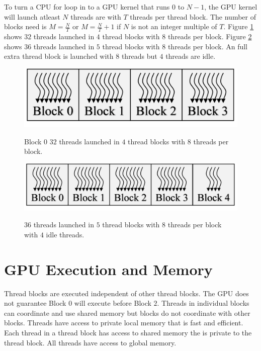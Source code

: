 To turn a CPU for loop in to a GPU kernel that runs $0$ to $N-1$, the GPU kernel will launch atleast $N$ threads are with $T$ threads per thread block.
The number of blocks need is $M = \frac{N}{T}$ or $M = \frac{N}{T}+1$ if $N$ is not an integer multiple of $T$.
Figure \ref{fig:threadsBlocks32} shows $32$ threads launched in $4$ thread blocks with $8$ threads per block.
Figure \ref{fig:threadsBlocks36} shows $36$ threads launched in $5$ thread blocks with $8$ threads per block. 
An full extra thread block is launched with $8$ threads but $4$ threads are idle.
\begin{figure}
	\centering\includegraphics[width=4in/100*55]{figures/gpu_intro/threadsBlocks32.pdf}
	\label{fig:threadsBlocks32}
	\caption{Block $0$ $32$ threads launched in $4$ thread blocks with $8$ threads per block.}
\end{figure}
\begin{figure}
	\centering\includegraphics[width=5in/100*55]{figures/gpu_intro/threadsBlocks36.pdf}
	\label{fig:threadsBlocks36}
	\caption{$36$ threads launched in $5$ thread blocks with $8$ threads per block with $4$ idle threads.}
\end{figure}

\section{GPU Execution and Memory}
\label{sec:GPU_memory}
Thread blocks are executed independent of other thread blocks.
The GPU does not guarantee Block $0$ will execute before Block $2$.
Threads in individual blocks can coordinate and use shared memory but blocks do not coordinate with other blocks.
Threads have access to private local memory that is fast and efficient.
Each thread in a thread block has access to shared memory the is private to the thread block.
All threads have access to global memory.

